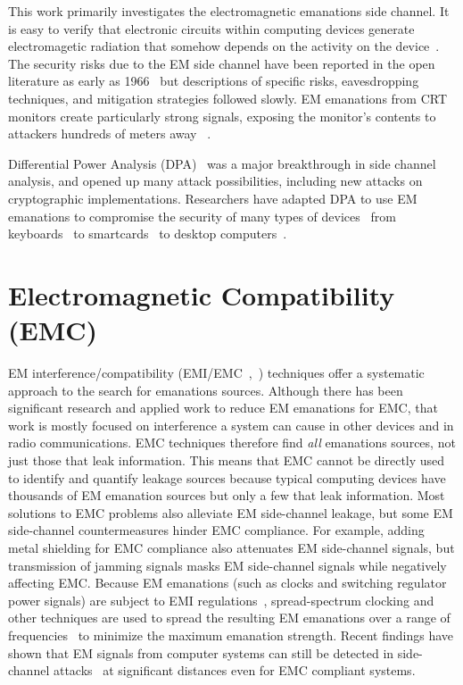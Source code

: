 This work primarily investigates the electromagnetic emanations side channel. It is easy to verify that electronic circuits within computing devices generate electromagetic radiation that somehow depends on the activity on the device~\cite{Rao02,Durak1999}. The security risks due to the EM side channel have been reported in the open literature as early as 1966~\cite{Highland86} but descriptions of specific risks, eavesdropping techniques, and mitigation strategies followed slowly. EM emanations from CRT monitors create particularly strong signals, exposing the monitor's contents to attackers hundreds of meters away ~\cite{Eck85,Khun03}.

Differential Power Analysis (DPA)~\cite{Kocher99} was a major breakthrough in side channel analysis, and opened up many attack possibilities, including new attacks on cryptographic implementations. Researchers have adapted DPA to use EM emanations to compromise the security of many types of devices~\cite{Rao02} from keyboards~\cite{Pasini10} to smartcards~\cite{kasper2009,Olivier01} to desktop computers~\cite{genkin_2014}.

\section{Electromagnetic Compatibility (EMC)}

EM interference/compatibility (EMI/EMC~\cite{HenryW.Ott2009},~\cite{Paul06}) techniques offer a systematic approach to the search for emanations sources. Although there has been significant research and applied work to reduce EM emanations for EMC, that work is mostly focused on interference a system can cause in other devices and in radio communications. EMC techniques therefore find \textit{all} emanations sources, not just those that leak information. This means that EMC cannot be directly used to identify and quantify leakage sources because typical computing devices have thousands of EM emanation sources but only a few that leak information. Most solutions to EMC problems also alleviate EM side-channel leakage, but some EM side-channel countermeasures hinder EMC compliance. For example, adding metal shielding for EMC compliance also attenuates EM side-channel signals, but transmission of jamming signals masks EM side-channel signals while negatively affecting EMC. Because EM emanations (such as clocks and switching regulator power signals) are subject to EMI regulations~\cite{erickson_2001}, spread-spectrum clocking and other techniques are used to spread the resulting EM emanations over a range of frequencies~\cite{hardin_1994} to minimize the maximum emanation strength. Recent findings have shown that EM signals from computer systems can still be detected in side-channel attacks~\cite{Seto13} at significant distances even for EMC compliant systems.


